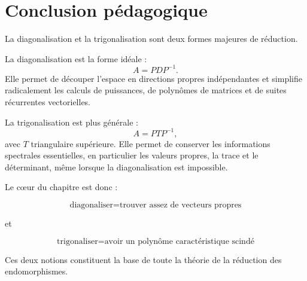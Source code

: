 \documentclass[11pt,a4paper]{article}
\begin{document}
\section*{Conclusion pédagogique}

La diagonalisation et la trigonalisation sont deux formes majeures de réduction.

La diagonalisation est la forme idéale :
\[
A=PDP^{-1}.
\]
Elle permet de découper l'espace en directions propres indépendantes et simplifie radicalement les calculs de puissances, de polynômes de matrices et de suites récurrentes vectorielles.

La trigonalisation est plus générale :
\[
A=PTP^{-1},
\]
avec \(T\) triangulaire supérieure.  
Elle permet de conserver les informations spectrales essentielles, en particulier les valeurs propres, la trace et le déterminant, même lorsque la diagonalisation est impossible.

Le cœur du chapitre est donc :

\[
\boxed{
\text{diagonaliser}=\text{trouver assez de vecteurs propres}
}
\]

et

\[
\boxed{
\text{trigonaliser}=\text{avoir un polynôme caractéristique scindé}
}
\]

Ces deux notions constituent la base de toute la théorie de la réduction des endomorphismes.
\end{document}
